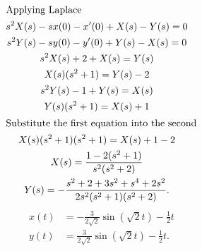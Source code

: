\documentclass{zc-ust-hw}
\begin{document}
\begin{enumerate}
    \begin{sol}
      \begin{gather}
        \intertext{Applying Laplace}
        s^2X(s)-sx(0)-x'(0)+X(s)-Y(s) = 0 \\
        s^2Y(s)-sy(0)-y'(0)+Y(s)-X(s) = 0 \\
        s^2X(s)+2+X(s) = Y(s) \\
        X(s)(s^2+1) = Y(s)-2 \\
        s^2Y(s)-1+Y(s) = X(s) \\
        Y(s)(s^2+1) = X(s)+1 \\
        \intertext{Substitute the first equation into the second}
        X(s)(s^2+1)(s^2+1) = X(s)+1-2 \\
        X(s) = \frac{1-2(s^2+1)}{s^2(s^2+2)} \\
        Y(s) = -\frac{s^2+2+3s^2+s^4+2s^2}{2s^2(s^2+1)(s^2+2)}
      .\end{gather}
      \begin{align}
          x(t) &= -\frac{3}{2\sqrt{2} }\sin (\sqrt{2} t) -\frac{1}{2}t\\
          y(t) &= \frac{3}{2\sqrt{2} }\sin (\sqrt{2} t)-\frac{1}{2}t
      .\end{align}
    \end{sol}
\end{enumerate}
\end{document}
